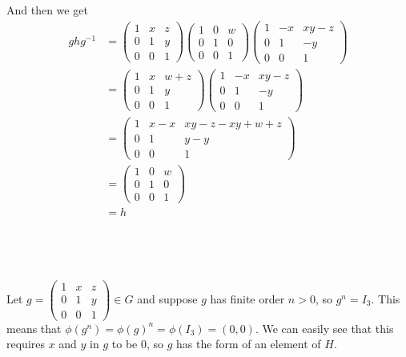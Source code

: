 \documentclass[a4paper]{article}
\begin{document}
And then we get
\begin{align*}
ghg^{-1} &= \begin{pmatrix}
    1 & x & z \\
    0 & 1 & y \\
    0 & 0 & 1
\end{pmatrix}
\begin{pmatrix}
    1 & 0 & w \\
    0 & 1 & 0 \\
    0 & 0 & 1
\end{pmatrix}
\begin{pmatrix}
    1 & -x & xy - z \\
    0 & 1 & -y \\
    0 & 0 & 1
\end{pmatrix} \\[1ex]
%
&= \begin{pmatrix}
    1 & x & w + z \\
    0 & 1 & y \\
    0 & 0 & 1
\end{pmatrix}
\begin{pmatrix}
    1 & -x & xy - z \\
    0 & 1 & -y \\
    0 & 0 & 1
\end{pmatrix} \\[1ex]
%
&= \begin{pmatrix}
    1 & x - x & xy - z - xy + w + z \\
    0 & 1 & y - y \\
    0 & 0 & 1
\end{pmatrix} \\[1ex]
%
&= \begin{pmatrix}
    1 & 0 & w \\
    0 & 1 & 0 \\
    0 & 0 & 1
\end{pmatrix} \\[0.5ex]
&= h
\end{align*}

\subsection{~} %

Let $g = \begin{pmatrix} 1 & x & z \\ 0 & 1 & y \\ 0 & 0 & 1 \end{pmatrix} \in G$ and suppose $g$ has finite order $n > 0$, so $g^n = I_3$. This means that $\phi(g^n) = {\phi(g)}^n = \phi(I_3) = (0, 0)$. We can easily see that this requires $x$ and $y$ in $g$ to be 0, so $g$ has the form of an element of $H$.
\end{document}
